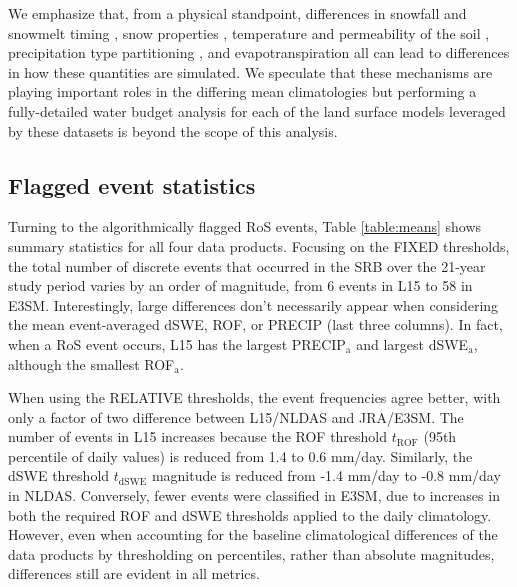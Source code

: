 \documentclass[nhess, manuscript]{copernicus}
\begin{document}
We emphasize that, from a physical standpoint, differences in snowfall and snowmelt timing \citep{rauscher2008future,mccabe2005trends}, snow properties \citep{brown2006evaluation}, temperature and permeability of the soil \citep{niu2006effects}, precipitation type partitioning \citep{knowles2006trends}, and evapotranspiration \citep{zheng2019on} all can lead to differences in how these quantities are simulated.
We speculate that these mechanisms are playing important roles in the differing mean climatologies but performing a fully-detailed water budget analysis for each of the land surface models leveraged by these datasets is beyond the scope of this analysis.

\subsection{Flagged event statistics}
\label{subsec:flaggedevents}

Turning to the algorithmically flagged RoS events, Table \ref{table:means} shows summary statistics for all four data products.
Focusing on the FIXED thresholds, the total number of discrete events that occurred in the SRB over the 21-year study period varies by an order of magnitude, from 6 events in L15 to 58 in E3SM.
Interestingly, large differences don't necessarily appear when considering the mean event-averaged dSWE, ROF, or PRECIP (last three columns).
In fact, when a RoS event occurs, L15 has the largest PRECIP$_{\textrm{a}}$ and largest dSWE$_{\textrm{a}}$, although the smallest ROF$_{\textrm{a}}$.

When using the RELATIVE thresholds, the event frequencies agree better, with only a factor of two difference between L15/NLDAS and JRA/E3SM.
The number of events in L15 increases because the ROF threshold $t_{\textrm{ROF}}$ (95th percentile of daily values) is reduced from 1.4 to 0.6 mm/day.
Similarly, the dSWE threshold $t_{\textrm{dSWE}}$ magnitude is reduced from -1.4 mm/day to -0.8 mm/day in NLDAS.
Conversely, fewer events were classified in E3SM, due to increases in both the required ROF and dSWE thresholds applied to the daily climatology.
However, even when accounting for the baseline climatological differences of the data products by thresholding on percentiles, rather than absolute magnitudes, differences still are evident in all metrics.
\end{document}
